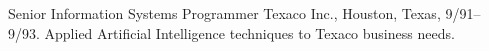 \documentclass[11pt]{resume}
\begin{document}
\section{}
    {Senior Information Systems Programmer} {Texaco Inc., Houston,
    Texas, 9/91--9/93.  Applied  Artificial
    Intelligence techniques to Texaco business needs.}

    
\end{document}
